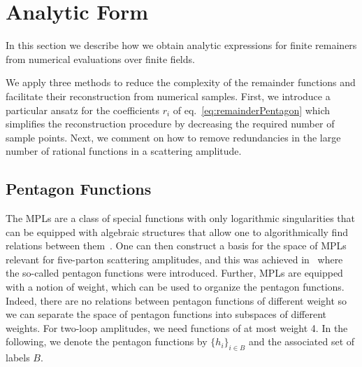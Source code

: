\section{Analytic Form}
\label{sec:AnalyticForm}
In this section we describe how we obtain analytic expressions
for finite remainers from numerical evaluations over finite fields.

We apply three methods to reduce the complexity of the remainder
functions and facilitate their reconstruction from numerical samples.
%
First, we introduce a particular ansatz for the coefficients $r_i$ of 
eq.~\eqref{eq:remainderPentagon} which simplifies the reconstruction procedure by
decreasing the required number of sample points. 
%
Next, we comment on how to remove redundancies
in the large number of rational functions in a scattering amplitude. 


\subsection{Pentagon Functions}
\label{sec:pentagon}
The MPLs are a class of special functions with 
only logarithmic singularities that can be equipped with algebraic
structures that allow one to algorithmically find relations between
them~\cite{Goncharov:2010jf,Duhr:2011zq,Duhr:2012fh}. One can then
construct a basis for the space of MPLs relevant for five-parton
scattering amplitudes, and this was achieved in~\cite{Gehrmann:2018yef}
where the so-called pentagon functions were introduced.
Further, MPLs are equipped with a notion of weight, which can
be used to organize the pentagon functions. Indeed, there are
no relations between pentagon functions of different weight so we can
separate the space of pentagon functions into subspaces of different 
weights. For two-loop amplitudes, we need functions of at most weight 4.
In the following, we denote the pentagon functions by $\{h_i\}_{i\in B}$ 
and the associated set of labels $B$. 

